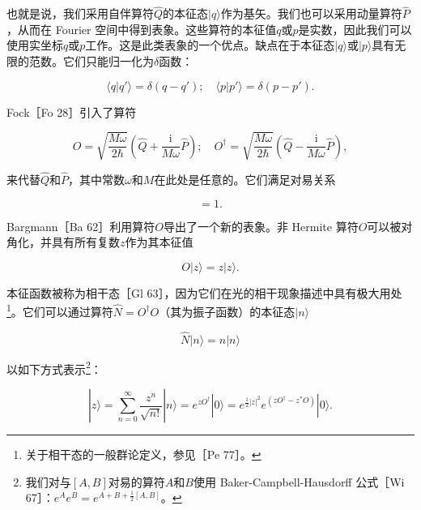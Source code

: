 也就是说，我们采用自伴算符$\hat{Q}$的本征态$|q\rangle$作为基矢。我们也可以采用动量算符$\hat{P}$，从而在
Fourier 空间中得到表象。这些算符的本征值$q$或$p$是实数，因此我们可以使用实坐标$q$或$p$工作。这是此类表象的一个优点。缺点在于本征态$|q\rangle$或$|p\rangle$具有无限的范数。它们只能归一化为$\delta$函数：

\begin{equation}
\langle q|q'\rangle=\delta(q-q');\quad\langle p|p'\rangle=\delta(p-p').\label{eq:10.61}
\end{equation}

Fock［Fo 28］引入了算符

\begin{equation}
O=\sqrt{\frac{M\omega}{2\hbar}}\left(\hat{Q}+\frac{\mathrm{i}}{M\omega}\hat{P}\right);\quad O^{\dagger}=\sqrt{\frac{M\omega}{2\hbar}}\left(\hat{Q}-\frac{\mathrm{i}}{M\omega}\hat{P}\right),\label{eq:10.62}
\end{equation}

来代替$\hat{Q}$和$\hat{P}$，其中常数$\omega$和$M$在此处是任意的。它们满足对易关系

\begin{equation}
[O,O^{\dagger}]=1.\label{eq:10.63}
\end{equation}

Bargmann［Ba 62］利用算符$O$导出了一个新的表象。非 Hermite 算符$O$可以被对角化，并具有所有复数$z$作为其本征值

\begin{equation}
O|z\rangle=z|z\rangle.\label{eq:10.64}
\end{equation}

本征函数被称为相干态［Gl 63］，因为它们在光的相干现象描述中具有极大用处\footnote{关于相干态的一般群论定义，参见［Pe 77］。}。它们可以通过算符$\hat{N}=O^{\dagger}O$（其为振子函数）的本征态$|n\rangle$

\begin{equation}
\hat{N}|n\rangle=n|n\rangle\label{eq:10.65}
\end{equation}

以如下方式表示\footnote{我们对与$[A,B]$对易的算符$A$和$B$使用 Baker-Campbell-Hausdorff 公式［Wi 67］：$e^{A}e^{B}=e^{A+B+\frac{1}{2}[A,B]}$。}：

\begin{equation}
|z\rangle=\sum^{\infty}_{n=0}\frac{z^{n}}{\sqrt{n!}}|n\rangle=e^{zO^{\dagger}}|0\rangle=e^{\frac{1}{2}|z|^{2}}e^{(zO^{\dagger}-z^{*}O)}|0\rangle.\label{eq:10.66}
\end{equation}

